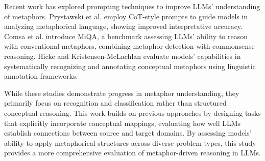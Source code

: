 Recent work has explored prompting techniques to improve LLMs’ understanding of metaphors. Prystawski et al. \cite{prystawski2023psychologically} employ CoT-style prompts to guide models in analyzing metaphorical language, showing improved interpretative accuracy. Comsa et al. \cite{Comsa} introduce MiQA, a benchmark assessing LLMs’ ability to reason with conventional metaphors, combining metaphor detection with commonsense reasoning. Hicke and Kristensen-McLachlan \cite{Hicke} evaluate models’ capabilities in systematically recognizing and annotating conceptual metaphors using linguistic annotation frameworks.

While these studies demonstrate progress in metaphor understanding, they primarily focus on recognition and classification rather than structured conceptual reasoning. This work builds on previous approaches by designing tasks that explicitly incorporate conceptual mappings, evaluating how well LLMs establish connections between source and target domains. By assessing models’ ability to apply metaphorical structures across diverse problem types, this study provides a more comprehensive evaluation of metaphor-driven reasoning in LLMs.